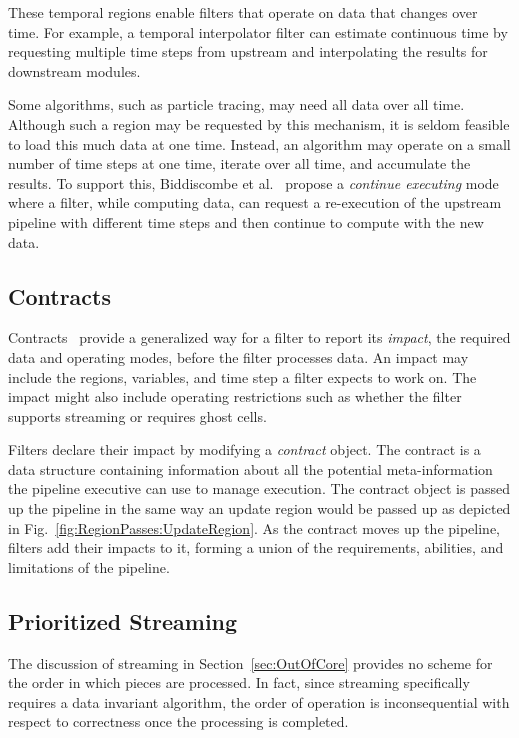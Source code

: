 \documentclass[journal,twocolumn,10pt,letterpaper,twoside]{IEEEtran}
\newcommand*{\lcite}[1]{~\cite{#1}}
\newcommand*{\scite}[1]{~\cite{#1}}
\newcommand*{\figref}[1]{Fig.~\ref{#1}}
\newcommand*{\keyterm}[1]{\emph{#1}}
\newcommand{\etal}{et al.}
\begin{document}
These temporal regions enable filters that operate on data that changes
over time.  For example, a temporal interpolator filter can estimate
continuous time by requesting multiple time steps from upstream and
interpolating the results for downstream modules.

Some algorithms, such as particle tracing, may need all data over all time.
Although such a region may be requested by this mechanism, it is seldom
feasible to load this much data at one time.  Instead, an algorithm may
operate on a small number of time steps at one time, iterate over all time,
and accumulate the results.  To support this, Biddiscombe
\etal\scite{Biddiscombe2007} propose a \keyterm{continue executing} mode
where a filter, while computing data, can request a re-execution of the
upstream pipeline with different time steps and then continue to compute
with the new data.

\subsection{Contracts}
\label{sec:Contracts}

Contracts\lcite{Childs2005} provide a generalized way for a filter to report
its \keyterm{impact}, the required data and operating modes, before the
filter processes data.  An impact may include the regions, variables, and
time step a filter expects to work on.  The impact might also include
operating restrictions such as whether the filter supports streaming or
requires ghost cells.

Filters declare their impact by modifying a \keyterm{contract} object.  The
contract is a data structure containing information about all the potential
meta-information the pipeline executive can use to manage execution.  The
contract object is passed up the pipeline in the same way an update region
would be passed up as depicted in
\figref{fig:RegionPasses:UpdateRegion}.  As the contract moves up the
pipeline, filters add their impacts to it, forming a union of the
requirements, abilities, and limitations of the pipeline.

\subsection{Prioritized Streaming}
\label{sec:PrioritizedStreaming}

The discussion of streaming in Section~\ref{sec:OutOfCore} provides no
scheme for the order in which pieces are processed.  In fact, since
streaming specifically requires a data invariant algorithm, the order of
operation is inconsequential with respect to correctness once the
processing is completed.
\end{document}
